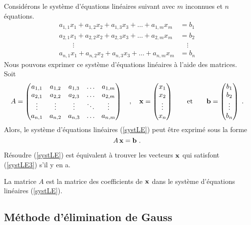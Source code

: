 {Considérons le système d'équations linéaires suivant avec $m$
inconnues et $n$ équations.
\begin{equation} \label{systLE}
\begin{split}
a_{1,1} x_1 + a_{1,2} x_2 + a_{1,3} x_3 + \ldots + a_{1,m} x_m &= b_1 \\
a_{2,1} x_1 + a_{2,2} x_2 + a_{2,3} x_3 + \ldots + a_{2,m} x_m &= b_2 \\
\qquad \vdots \qquad & \quad \vdots \\
a_{n,1} x_1 + a_{n,2} x_2 + a_{n,3} x_3 + \ldots + a_{n,m} x_m &= b_n
\end{split}
\end{equation}
Nous pouvons exprimer ce système d'équations linéaires à l'aide des
matrices.  Soit
\[
A=\begin{pmatrix}
a_{1,1} & a_{1,2} & a_{1,3} & \ldots & a_{1,m} \\
a_{2,1} & a_{2,2} & a_{2,3} & \ldots & a_{2,m} \\
\vdots & \vdots & \vdots & \ddots & \vdots \\
a_{n,1} & a_{n,2} & a_{n,3} & \ldots & a_{n,m}
\end{pmatrix}
\quad , \quad
\mathbf{x} =
\begin{pmatrix}
x_1 \\ x_2 \\ \vdots \\ x_n
\end{pmatrix}
\qquad \text{et} \qquad
\mathbf{b} =
\begin{pmatrix}
b_1 \\ b_2 \\ \vdots \\ b_n
\end{pmatrix} \; .
\]
Alors, le système d'équations linéaires (\ref{systLE}) peut être
exprimé sous la forme
\begin{equation}\label{systLE3}
A\,\mathbf{x} = \mathbf{b} \ .
\end{equation}

\begin{focus}{\prp}
Résoudre (\ref{systLE}) est équivalent à trouver les vecteurs
$\mathbf{x}$ qui satisfont (\ref{systLE3}) s'il y en a.
\end{focus}

La matrice $A$ est la matrice des coefficients de $\mathbf{x}$ dans le
système d'équations linéaires (\ref{systLE}).

\subsection{Méthode d'élimination de Gauss}

}
